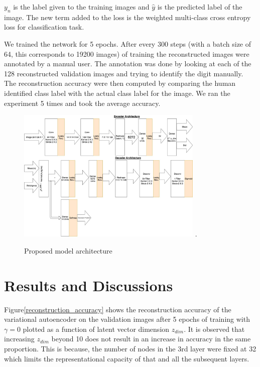 \documentclass{uai2021} %
\begin{document}
$y_n$ is the label given to the training images and $\hat{y}$ is the predicted label of the image.
The new term added to the loss is the weighted multi-class cross entropy loss for classification task.

We trained the network for 5 epochs.
After every 300 steps (with a batch size of 64, this corresponds to 19200 images) of training the reconstructed images were annotated by a manual user.
The annotation was done by looking at each of the 128  reconstructed validation images and trying to identify the digit manually.
The reconstruction accuracy were then computed by comparing the human identified class label with the actual class label for the image.
We ran the experiment 5 times and took the average accuracy.


\begin{figure}[!t]
\centering
\includegraphics[width=3.5in]{vae_model_architecture_classification.jpg}
\DeclareGraphicsExtensions.
\caption{Proposed model architecture}
\label{vae_architecture}
\end{figure}

\section{Results and Discussions} \label{results}
Figure\ref{reconstruction_accuracy} shows  the reconstruction accuracy of the variational autoencoder on the validation images after 5 epochs of training with $\gamma = 0$  plotted as a function of latent vector dimension $z_{dim}$.
It is observed that increasing $z_{dim}$ beyond 10 does not result in an increase in accuracy in the same proportion.
This is because, the number of nodes in the 3rd layer were fixed at 32 which limits the representational capacity of that and all the subsequent layers.
\end{document}
